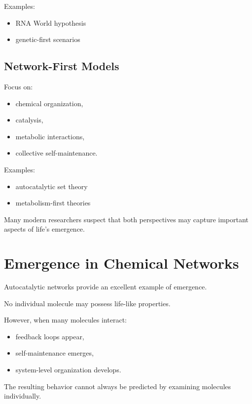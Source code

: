 \documentclass[
  oneside,
  openany]{book}
\providecommand{\tightlist}{%
  \setlength{\itemsep}{0pt}\setlength{\parskip}{0pt}}
\begin{document}
Examples:

\begin{itemize}
\tightlist
\item
  RNA World hypothesis
\item
  genetic-first scenarios
\end{itemize}

\subsection{Network-First Models}\label{network-first-models}

Focus on:

\begin{itemize}
\tightlist
\item
  chemical organization,
\item
  catalysis,
\item
  metabolic interactions,
\item
  collective self-maintenance.
\end{itemize}

Examples:

\begin{itemize}
\tightlist
\item
  autocatalytic set theory
\item
  metabolism-first theories
\end{itemize}

Many modern researchers suspect that both perspectives may capture important aspects of life's emergence.

\section{Emergence in Chemical Networks}\label{emergence-in-chemical-networks}

Autocatalytic networks provide an excellent example of emergence.

No individual molecule may possess life-like properties.

However, when many molecules interact:

\begin{itemize}
\tightlist
\item
  feedback loops appear,
\item
  self-maintenance emerges,
\item
  system-level organization develops.
\end{itemize}

The resulting behavior cannot always be predicted by examining molecules individually.
\end{document}
